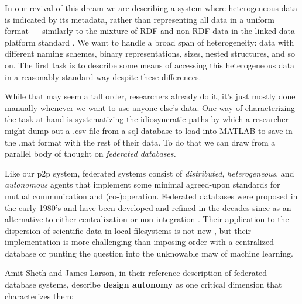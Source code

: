 In our revival of this dream we are describing a system where
heterogeneous data is indicated by its metadata, rather than
representing all data in a uniform format --- similarly to the mixture
of RDF and non-RDF data in the linked data platform standard \citep{speicherLinkedDataPlatform2015} . We want to handle a broad span of
heterogeneity: data with different naming schemes, binary
representations, sizes, nested structures, and so on. The first task is
to describe some means of accessing this heterogeneous data in a
reasonably standard way despite these differences.

While that may seem a tall order, researchers already do it, it's just
mostly done manually whenever we want to use anyone else's data. One way
of characterizing the task at hand is systematizing the idiosyncratic
paths by which a researcher might dump out a .csv file from a sql
database to load into MATLAB to save in the .mat format with the rest of
their data. To do that we can draw from a parallel body of thought on
\emph{federated databases.}

Like our p2p system, federated systems consist of \emph{distributed},
\emph{heterogeneous}, and \emph{autonomous} agents that implement some
minimal agreed-upon standards for mutual communication and
(co-)operation. Federated databases were proposed in the early 1980's
\citep{heimbignerFederatedArchitectureInformation1985}  and have
been developed and refined in the decades since as an alternative to
either centralization or non-integration \citep{litwinInteroperabilityMultipleAutonomous1990, kashyapSemanticSchematicSimilarities1996, hullManagingSemanticHeterogeneity1997} . Their application to the
dispersion of scientific data in local filesystems is not new \citep{busseFederatedInformationSystems1999, djokic-petrovicPIBASFedSPARQLWebbased2017, hasnainBioFedFederatedQuery2017} , but their implementation is more
challenging than imposing order with a centralized database or punting
the question into the unknowable maw of machine learning.

Amit Sheth and James Larson, in their reference description of federated
database systems, describe \textbf{design autonomy} as one critical
dimension that characterizes them:

